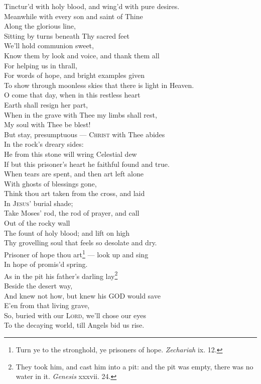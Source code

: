  Tinctur’d with holy blood, and wing’d with pure desires. \\
  Meanwhile with every son and saint of Thine \\
 Along the glorious line, \\
 Sitting by turns beneath Thy sacred feet \\
 We’ll hold communion sweet, \\
 Know them by look and voice, and thank them all \\
 For helping us in thrall, \\
 For words of hope, and bright examples given \\
 To show through moonless skies that there is light in Heaven. \\
  O come that day, when in this restless heart \\
 Earth shall resign her part, \\
 When in the grave with Thee my limbs shall rest, \\
 My soul with Thee be blest! \\
 But stay, presumptuous — \textsc{Christ} with Thee abides \\
 In the rock’s dreary sides: \\
 He from this stone will wring Celestial dew \\
 If but this prisoner’s heart he faithful found and true. \\
  When tears are spent, and then art left alone \\
 With ghosts of blessings gone, \\
 Think thou art taken from the cross, and laid \\
 In \textsc{Jesus}’ burial shade; \\
 Take Moses’ rod, the rod of prayer, and call \\
 Out of the rocky wall \\
 The fount of holy blood; and lift on high \\
 Thy grovelling soul that feels so desolate and dry. \\
  Prisoner of hope thou art\footnote{Turn ye to the stronghold, ye prisoners of hope. \emph{Zechariah} ix. 12.} — look up and sing \\
 In hope of promis’d spring. \\
 As in the pit his father’s darling lay\footnote{They took him, and cast him into a pit: and the pit was empty, there was no water in it. \emph{Genesis} xxxvii. 24.} \\
 Beside the desert way, \\
 And knew not how, but knew his GOD would save \\
 E’en from that living grave, \\
 So, buried with our \textsc{Lord}, we’ll chose our eyes \\
 To the decaying world, till Angels bid us rise.\\

